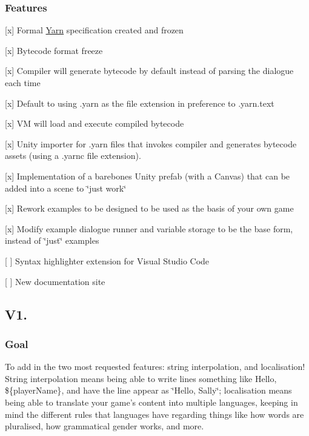 \subsubsection*{Features}


\begin{DoxyItemize}
\item \mbox{[}x\mbox{]} Formal \hyperlink{a00050}{Yarn} specification created and frozen
\item \mbox{[}x\mbox{]} Bytecode format freeze
\item \mbox{[}x\mbox{]} Compiler will generate bytecode by default instead of parsing the dialogue each time
\item \mbox{[}x\mbox{]} Default to using {\ttfamily .yarn} as the file extension in preference to {\ttfamily .yarn.\-text}
\item \mbox{[}x\mbox{]} V\-M will load and execute compiled bytecode
\item \mbox{[}x\mbox{]} Unity importer for {\ttfamily .yarn} files that invokes compiler and generates bytecode assets (using a {\ttfamily .yarnc} file extension).
\item \mbox{[}x\mbox{]} Implementation of a barebones Unity prefab (with a Canvas) that can be added into a scene to \char`\"{}just work\char`\"{}
\item \mbox{[}x\mbox{]} Rework examples to be designed to be used as the basis of your own game
\item \mbox{[}x\mbox{]} Modify example dialogue runner and variable storage to be the base form, instead of \char`\"{}just\char`\"{} examples
\item \mbox{[} \mbox{]} Syntax highlighter extension for Visual Studio Code
\item \mbox{[} \mbox{]} New documentation site
\end{DoxyItemize}

\subsection*{V1.}

\subsubsection*{Goal}

To add in the two most requested features\-: string interpolation, and localisation! String interpolation means being able to write lines something like {\ttfamily Hello, \$\{player\-Name\}}, and have the line appear as \char`\"{}\-Hello, Sally\char`\"{}; localisation means being able to translate your game's content into multiple languages, keeping in mind the different rules that languages have regarding things like how words are pluralised, how grammatical gender works, and more.

